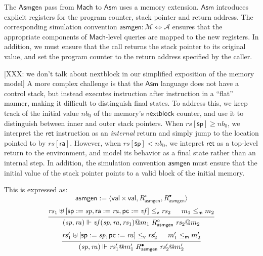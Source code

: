 \documentclass[11pt,oneside,draft]{book}
\theoremstyle{definition}
\newcommand{\kw}[1]{\ensuremath{ \mathsf{#1} }}
\newcommand{\que}{\circ}         %
\newcommand{\ans}{\bullet}       %
\newcommand{\vref}{\le_\kw{v}}   %
\newcommand{\mext}{\le_\kw{m}}   %
\begin{document}
The \kw{Asmgen} pass from \kw{Mach} to \kw{Asm}
uses a memory extension.
\kw{Asm} introduces explicit registers for the
program counter, stack pointer and return address.
The corresponding simulation convention
$\kw{asmgen} : \mathcal{M} \Leftrightarrow \mathcal{A}$
ensures that the appropriate components of
\kw{Mach}-level queries are mapped to the new registers.
In addition,
we must ensure that the call returns the stack pointer
to its original value,
and set the program counter to the return address
specified by the caller.

[XXX: we don't talk about nextblock in our simplified
exposition of the memory model]
A more complex challenge is that the $\kw{Asm}$ language
does not have a control stack,
but instead executes instruction after instruction
in a ``flat'' manner,
making it difficult to distinguish final states.
To address this,
we keep track of the initial value $\mathit{nb}_0$ of
the memory's $\kw{nextblock}$ counter,
and use it to distinguish between inner and outer
stack pointers.
When $\mathit{rs}[\kw{sp}] \ge \mathit{nb}_0$,
we interpret the \kw{ret} instruction as an \emph{internal} return
and simply jump to the location pointed to by $\mathit{rs}[\kw{ra}]$.
However, when $\mathit{rs}[\kw{sp}] < \mathit{nb}_0$,
we intepret \kw{ret} as a top-level return to the environment,
and model its behavior as a final state
rather than an internal step.
In addition,
the simulation convention $\kw{asmgen}$
must ensure that the initial value of the stack pointer
points to a valid block of the initial memory.

This is expressed as:
\[
  \kw{asmgen} := \langle \kw{val} \times \kw{val},
    R_\kw{asmgen}^\que, R_\kw{asmgen}^\ans \rangle
\]
\[
  \begin{prooftree}
  \hypo{\mathit{rs}_1 \uplus
    [\kw{sp} := \mathit{sp}, \kw{ra} := \mathit{ra}, \kw{pc} := \mathit{vf}]
    \vref \mathit{rs}_2}
  \hypo{m_1 \mext m_2}
  \infer2{
    (\mathit{sp}, \mathit{ra}) \Vdash
     \mathit{vf}(\mathit{sp}, \mathit{ra}, \mathit{rs}_1)@m_1
     \mathrel{R_\kw{asmgen}^\que}
     \mathit{rs}_2@m_2}
  \end{prooftree}
\]
\[
  \begin{prooftree}
  \hypo{
    \mathit{rs}_1' \uplus [\kw{sp} := \mathit{sp}, \kw{pc} := \mathit{ra}]
    \vref \mathit{rs}_2'}
  \hypo{m_1' \mext m_2'}
  \infer2{
    (\mathit{sp}, \mathit{ra}) \Vdash \mathit{rs}_1'@m_1'
    \mathrel{R_\kw{asmgen}^\ans}
    \mathit{rs}_2'@m_2'}
  \end{prooftree}
\]
\end{document}
